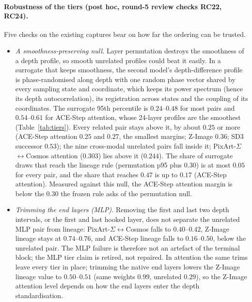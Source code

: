 \documentclass[11pt]{article}
\begin{document}
\paragraph{Robustness of the tiers (post hoc, round-5 review checks RC22, RC24).} Five checks on the existing captures bear on how far the ordering can be trusted.
\begin{itemize}
 \item \emph{A smoothness-preserving null.} Layer permutation destroys the smoothness of a depth profile, so smooth unrelated profiles could beat it easily. In a surrogate that keeps smoothness, the second model's depth-difference profile is phase-randomised along depth with one random phase vector shared by every sampling state and coordinate, which keeps its power spectrum (hence its depth autocorrelation), its registration across states and the coupling of its coordinates. The surrogate 95th percentile is $0.24$--$0.48$ for most pairs and $0.54$--$0.61$ for ACE-Step attention, whose 24-layer profiles are the smoothest (Table~\ref{tab:tiers}). Every related pair stays above it, by about $0.25$ or more (ACE-Step attention $0.25$ and $0.27$, the smallest margins; Z-Image $0.36$; SD3 successor $0.53$); the nine cross-modal unrelated pairs fall inside it; PixArt-$\Sigma$$\leftrightarrow$Cosmos attention ($0.303$) lies above it ($0.244$). The share of surrogate draws that reach the lineage rule (permutation p95 plus $0.30$) is at most $0.05$ for every pair, and the share that reaches $0.47$ is up to $0.17$ (ACE-Step attention). Measured against this null, the ACE-Step attention margin is below the $0.30$ the frozen rule asks of the permutation null.
 \item \emph{Trimming the end layers (MLP).} Removing the first and last two depth intervals, or the first and last hooked layer, does not separate the unrelated MLP pair from lineage: PixArt-$\Sigma$$\leftrightarrow$Cosmos falls to $0.40$--$0.42$, Z-Image lineage stays at $0.74$--$0.76$, and ACE-Step lineage falls to $0.16$--$0.50$, below the unrelated pair. The MLP failure is therefore not an artefact of the terminal block; the MLP tier claim is retired, not repaired. In attention the same trims leave every tier in place; trimming the native end layers lowers the Z-Image lineage value to $0.50$--$0.51$ (same weights $0.99$, unrelated $0.29$), so the Z-Image attention level depends on how the end layers enter the depth standardisation.

\end{itemize}
\end{document}
